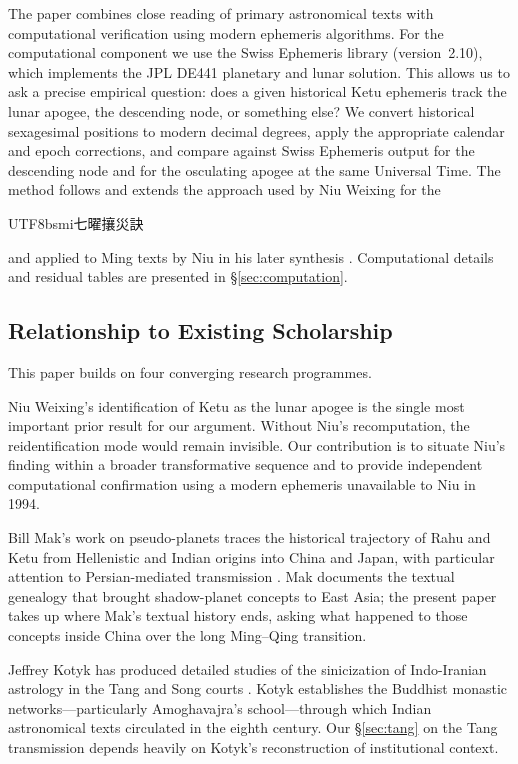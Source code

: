 \documentclass[10pt,a4paper]{article}
\newcommand{\zh}[1]{\begin{CJK}{UTF8}{bsmi}#1\end{CJK}}
\begin{document}
The paper combines close reading of primary astronomical texts with computational
verification using modern ephemeris algorithms.  For the computational component
we use the Swiss Ephemeris library (version~2.10), which implements the JPL
DE441 planetary and lunar solution.  This allows us to ask a precise empirical
question: does a given historical Ketu ephemeris track the lunar apogee, the
descending node, or something else?  We convert historical sexagesimal positions
to modern decimal degrees, apply the appropriate calendar and epoch corrections,
and compare against Swiss Ephemeris output for the descending node and for the
osculating apogee at the same Universal Time.  The method follows and extends
the approach used by Niu Weixing \cite{niu1995ketu} for the \zh{七曜攘災訣} and
applied to Ming texts by Niu in his later synthesis \cite{niu2010fourremains}.
Computational details and residual tables are presented in \S\ref{sec:computation}.

\subsection*{Relationship to Existing Scholarship}

This paper builds on four converging research programmes.

Niu Weixing's identification of Ketu as the lunar apogee
\cite{niu1995ketu,niu2010fourremains} is the single most important prior result
for our argument.  Without Niu's recomputation, the reidentification mode would
remain invisible.  Our contribution is to situate Niu's finding within a broader
transformative sequence and to provide independent computational confirmation
using a modern ephemeris unavailable to Niu in 1994.

Bill Mak's work on pseudo-planets traces the historical trajectory of Rahu and
Ketu from Hellenistic and Indian origins into China and Japan, with particular
attention to Persian-mediated transmission \cite{mak2014pseudoplanets,mak2024persian}.
Mak documents the textual genealogy that brought shadow-planet concepts to East
Asia; the present paper takes up where Mak's textual history ends, asking what
happened to those concepts inside China over the long Ming--Qing transition.

Jeffrey Kotyk has produced detailed studies of the sinicization of Indo-Iranian
astrology in the Tang and Song courts \cite{kotyk2018sinicization,kotyk2017buddhist}.
Kotyk establishes the Buddhist monastic networks---particularly Amoghavajra's
school---through which Indian astronomical texts circulated in the eighth century.
Our \S\ref{sec:tang} on the Tang transmission depends heavily on Kotyk's
reconstruction of institutional context.
\end{document}
